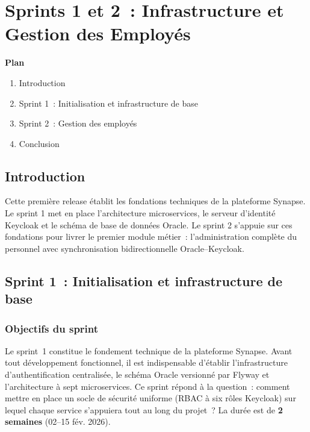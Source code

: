 ﻿%
\chapter{Sprints 1 et 2~: Infrastructure et Gestion des Employés}

\noindent\textbf{Plan}
\begin{enumerate}
  \item Introduction
  \item Sprint 1~: Initialisation et infrastructure de base
  \item Sprint 2~: Gestion des employés
  \item Conclusion
\end{enumerate}

\section{Introduction}

Cette première release établit les fondations techniques de la plateforme Synapse.
Le sprint 1 met en place l’architecture microservices, le serveur d’identité Keycloak
et le schéma de base de données Oracle. Le sprint 2 s’appuie sur ces fondations pour
livrer le premier module métier~: l'administration complète du personnel
avec synchronisation bidirectionnelle Oracle--Keycloak.

\section{Sprint 1~: Initialisation et infrastructure de base}

\subsection{Objectifs du sprint}

Le sprint~1 constitue le fondement technique de la plateforme Synapse. Avant tout
développement fonctionnel, il est indispensable d’établir l’infrastructure
d’authentification centralisée, le schéma Oracle versionné par Flyway et
l’architecture à sept microservices. Ce sprint répond à la question~: comment
mettre en place un socle de sécurité uniforme (RBAC à six rôles Keycloak)
sur lequel chaque service s’appuiera tout au long du projet~? La durée est de
\textbf{2 semaines} (02--15 fév. 2026).


